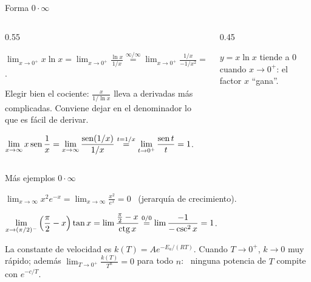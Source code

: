 \documentclass[10pt,aspectratio=169]{beamer}
\begin{document}
\begin{frame}{Forma $0\cdot\infty$}
  \begin{columns}
    \begin{column}{0.55\textwidth}
      \begin{ejemplo}[1]
        $\displaystyle\lim_{x\to0^+}x\ln x=\lim_{x\to0^+}\frac{\ln x}{1/x}\overset{\infty/\infty}{=}\lim_{x\to0^+}\frac{1/x}{-1/x^2}=\lim_{x\to0^+}(-x)=0$.
      \end{ejemplo}
      \begin{observacion}
        Elegir bien el cociente: $\frac{x}{1/\ln x}$ lleva a derivadas más complicadas. Conviene dejar en el denominador lo que es fácil de derivar.
      \end{observacion}
      \begin{ejemplo}[2]
        $\displaystyle\lim_{x\to\infty}x\operatorname{sen}\frac1x=\lim_{x\to\infty}\frac{\operatorname{sen}(1/x)}{1/x}\overset{t=1/x}{=}\lim_{t\to0^+}\frac{\operatorname{sen} t}{t}=1$.
      \end{ejemplo}
    \end{column}
    \begin{column}{0.45\textwidth}
      \centering

      \small $y=x\ln x$ tiende a $0$ cuando $x\to0^+$: el factor $x$ ``gana''.
    \end{column}
  \end{columns}
\end{frame}

\begin{frame}{Más ejemplos $0\cdot\infty$}
  \begin{ejemplo}[3]
    $\displaystyle\lim_{x\to\infty}x^2e^{-x}=\lim_{x\to\infty}\frac{x^2}{e^x}=0$ \ (jerarquía de crecimiento).
  \end{ejemplo}
  \begin{ejemplo}[4]
    $\displaystyle\lim_{x\to(\pi/2)^-}\left(\frac\pi2-x\right)\tan x=\lim\frac{\frac\pi2-x}{\operatorname{ctg} x}\overset{0/0}{=}\lim\frac{-1}{-\csc^2x}=1$.
  \end{ejemplo}
  \begin{ejemplo}
    La constante de velocidad es $k(T)=Ae^{-E_a/(RT)}$. Cuando $T\to0^+$, $k\to0$ muy rápido; además
    $\displaystyle\lim_{T\to0^+}\frac{k(T)}{T^n}=0$ para todo $n$: \ ninguna potencia de $T$ compite con $e^{-c/T}$.
  \end{ejemplo}
\end{frame}
\end{document}
